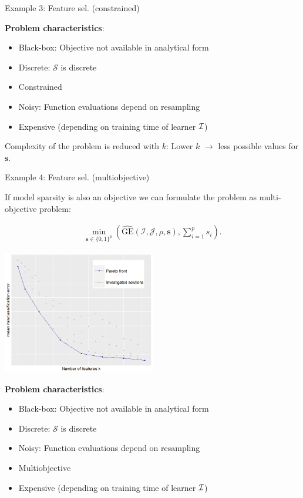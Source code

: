 \documentclass[11pt,compress,t,notes=noshow, xcolor=table]{beamer}
\begin{document}
\begin{vbframe}{Example 3: Feature sel. (constrained)}
\framebreak

\lz 

\textbf{Problem characteristics}:
\begin{itemize}
	\item Black-box: Objective not available in analytical form
	\item Discrete: $\mathcal{S}$ is discrete
	\item Constrained 
	\item Noisy: Function evaluations depend on resampling	
	\item Expensive (depending on training time of learner $\mathcal{I}$)
\end{itemize}

\lz 

Complexity of the problem is reduced with $k$: Lower $k$ $\to$ less possible values for $\bm{s}$. 

\end{vbframe}



\begin{vbframe}{Example 4: Feature sel. (multiobjective)}

If model sparsity is also an objective we can formulate the problem as multi-objective problem:

  \begin{eqnarray*}
    \min_{\textbf{s} \in \{0, 1\}^p} \left(\widehat{\text{GE}}(\mathcal{I}, \mathcal{J}, \rho, \bm{s}), \sum\nolimits_{i = 1}^p s_i\right). 
  \end{eqnarray*}

    \begin{center}
            \includegraphics[width= 0.5\textwidth]{figure_man/pareto.png}
    \end{center}



\framebreak

\textbf{Problem characteristics}:
\begin{itemize}
	\item Black-box: Objective not available in analytical form
	\item Discrete: $\mathcal{S}$ is discrete
	\item Noisy: Function evaluations depend on resampling	
	\item Multiobjective
	\item Expensive (depending on training time of learner $\mathcal{I}$)	
\end{itemize}

\end{vbframe}
\end{document}
